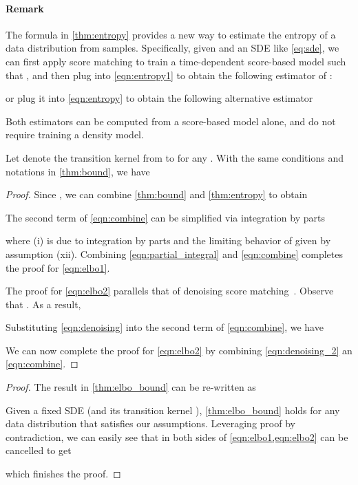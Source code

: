 \paragraph{Remark} The formula in \cref{thm:entropy} provides a new way to estimate the entropy of a data distribution from \iid samples. Specifically, given  and an SDE like \cref{eq:sde}, we can first apply score matching to train a time-dependent score-based model such that , and then plug  into \cref{eqn:entropy1} to obtain the following estimator of :

or plug it into \cref{eqn:entropy} to obtain the following alternative estimator

Both estimators can be computed from a score-based model alone, and do not require training a density model. 

\begin{theorem}\label{thm:elbo_bound}
Let  denote the transition kernel from  to  for any . With the same conditions and notations in \cref{thm:bound}, we have

\end{theorem}
\begin{proof}
Since , we can combine \cref{thm:bound} and \cref{thm:entropy} to obtain

The second term of \cref{eqn:combine} can be simplified via integration by parts

where (i) is due to integration by parts and the limiting behavior of  given by assumption (xii). Combining \cref{eqn:partial_integral} and \cref{eqn:combine} completes the proof for \cref{eqn:elbo1}.

The proof for \cref{eqn:elbo2} parallels that of denoising score matching~\cite{vincent2011connection}. Observe that . As a result,

Substituting \cref{eqn:denoising} into the second term of \cref{eqn:combine}, we have

We can now complete the proof for \cref{eqn:elbo2} by combining \cref{eqn:denoising_2} an \cref{eqn:combine}.
\end{proof}

\pointelbo*
\begin{proof}
The result in \cref{thm:elbo_bound} can be re-written as

Given a fixed SDE (and its transition kernel ), \cref{thm:elbo_bound} holds for any data distribution  that satisfies our assumptions. Leveraging proof by contradiction, we can easily see that  in both sides of \cref{eqn:elbo1,eqn:elbo2} can be cancelled to get 

which finishes the proof.
\end{proof}


